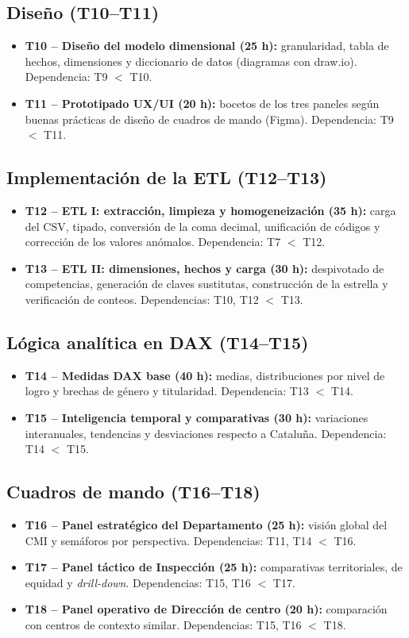 \documentclass[12pt, a4paper, oneside]{report}
\begin{document}
\subsection{Diseño (T10--T11)}
\begin{itemize}
    \item \textbf{T10 -- Diseño del modelo dimensional (25 h):} granularidad, tabla de hechos, dimensiones y diccionario de datos (diagramas con draw.io). Dependencia: T9 $<$ T10.
    \item \textbf{T11 -- Prototipado UX/UI (20 h):} bocetos de los tres paneles según buenas prácticas de diseño de cuadros de mando \cite{few2006information} (Figma). Dependencia: T9 $<$ T11.
\end{itemize}

\subsection{Implementación de la ETL (T12--T13)}
\begin{itemize}
    \item \textbf{T12 -- ETL I: extracción, limpieza y homogeneización (35 h):} carga del CSV, tipado, conversión de la coma decimal, unificación de códigos y corrección de los valores anómalos. Dependencia: T7 $<$ T12.
    \item \textbf{T13 -- ETL II: dimensiones, hechos y carga (30 h):} despivotado de competencias, generación de claves sustitutas, construcción de la estrella y verificación de conteos. Dependencias: T10, T12 $<$ T13.
\end{itemize}

\subsection{Lógica analítica en DAX (T14--T15)}
\begin{itemize}
    \item \textbf{T14 -- Medidas DAX base (40 h):} medias, distribuciones por nivel de logro y brechas de género y titularidad. Dependencia: T13 $<$ T14.
    \item \textbf{T15 -- Inteligencia temporal y comparativas (30 h):} variaciones interanuales, tendencias y desviaciones respecto a Cataluña. Dependencia: T14 $<$ T15.
\end{itemize}

\subsection{Cuadros de mando (T16--T18)}
\begin{itemize}
    \item \textbf{T16 -- Panel estratégico del Departamento (25 h):} visión global del CMI y semáforos por perspectiva. Dependencias: T11, T14 $<$ T16.
    \item \textbf{T17 -- Panel táctico de Inspección (25 h):} comparativas territoriales, de equidad y \textit{drill-down}. Dependencias: T15, T16 $<$ T17.
    \item \textbf{T18 -- Panel operativo de Dirección de centro (20 h):} comparación con centros de contexto similar. Dependencias: T15, T16 $<$ T18.
\end{itemize}
\end{document}
